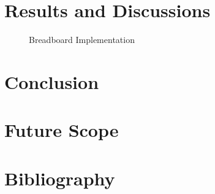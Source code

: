 \documentclass[12pt,a4paper]{report}
\begin{document}
\vspace{1cm}

\chapter{Results and Discussions}

\begin{figure}[ht]
\centering
\vspace{6cm}
\caption{Breadboard Implementation}
\end{figure}


\chapter{Conclusion}

\chapter{Future Scope}

\chapter*{Bibliography}
\end{document}
